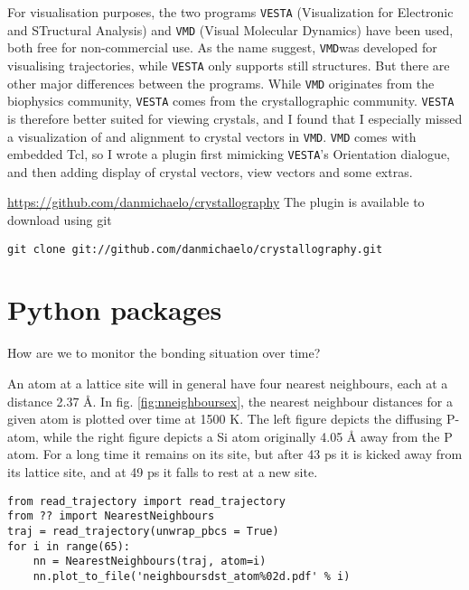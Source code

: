 \documentclass[11pt,bibliography=totoc,index=totoc]{scrbook}   %
\newcommand{\vesta}{{\texttt{VESTA}}} %
\newcommand{\vmd}{{\texttt{VMD}}} %
\begin{document}
For visualisation purposes, the two programs {\vesta} (Visualization for Electronic and STructural Analysis) and {\vmd} (Visual Molecular Dynamics) have been used, both free for non-commercial use.
As the name suggest, \vmd was developed for visualising trajectories, while {\vesta} only supports still structures.
But there are other major differences between the programs. While {\vmd} originates from the biophysics community, {\vesta} comes from the crystallographic community.
{\vesta} is therefore better suited for viewing crystals, and I found that I especially missed a visualization of and alignment to crystal vectors in \vmd.
{\vmd} comes with embedded Tcl, so I wrote a plugin first mimicking {\vesta}'s Orientation dialogue, and then adding 
display of crystal vectors, view vectors and some extras.

\url{https://github.com/danmichaelo/crystallography}
The plugin is available to download using git
\lstset{language=Bash}
\begin{lstlisting}
git clone git://github.com/danmichaelo/crystallography.git
\end{lstlisting}

\section{Python packages}

How are we to monitor the bonding situation over time?

An atom at a lattice site will in general have four nearest neighbours, each at a distance 2.37 Å.
In fig. \ref{fig:nneighboursex}, the nearest neighbour distances for a given atom is plotted over time 
at 1500 K.
The left figure depicts the diffusing P-atom, while the right figure depicts a Si atom originally 4.05 Å 
away from the P atom. 
For a long time it remains on its site, but after 43 ps it is kicked away from its lattice site, 
and at 49 ps it falls to rest at a new site.

\begin{lstlisting}
from read_trajectory import read_trajectory
from ?? import NearestNeighbours
traj = read_trajectory(unwrap_pbcs = True)
for i in range(65):
    nn = NearestNeighbours(traj, atom=i)
    nn.plot_to_file('neighboursdst_atom%02d.pdf' % i)
\end{lstlisting}
\end{document}

